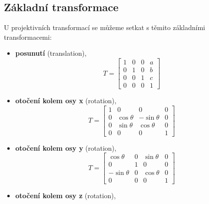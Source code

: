 \subsection{Základní transformace}
U projektivních transformací se můžeme setkat s těmito základními transformacemi:
\begin{itemize}
    \item \textbf{posunutí} (translation),
          \begin{equation*}
              T = \begin{bmatrix}
                  1 & 0 & 0 & a \\[0.3em]
                  0 & 1 & 0 & b \\[0.3em]
                  0 & 0 & 1 & c \\[0.3em]
                  0 & 0 & 0 & 1
              \end{bmatrix}
          \end{equation*}
    \item \textbf{otočení kolem osy x} (rotation),
          \begin{equation*}
              T =   \begin{bmatrix}
                  1 & 0            & 0             & 0 \\[0.3em]
                  0 & \cos{\theta} & -\sin{\theta} & 0 \\[0.3em]
                  0 & \sin{\theta} & \cos{\theta}  & 0 \\[0.3em]
                  0 & 0            & 0             & 1
              \end{bmatrix}
          \end{equation*}
    \item \textbf{otočení kolem osy y} (rotation),
          \begin{equation*}
              T =   \begin{bmatrix}
                  \cos{\theta}  & 0 & \sin{\theta} & 0 \\[0.3em]
                  0             & 1 & 0            & 0 \\[0.3em]
                  -\sin{\theta} & 0 & \cos{\theta} & 0 \\[0.3em]
                  0             & 0 & 0            & 1
              \end{bmatrix}
          \end{equation*}
    \item \textbf{otočení kolem osy z} (rotation),
          \begin{equation*}

\end{equation*}
\end{itemize}

